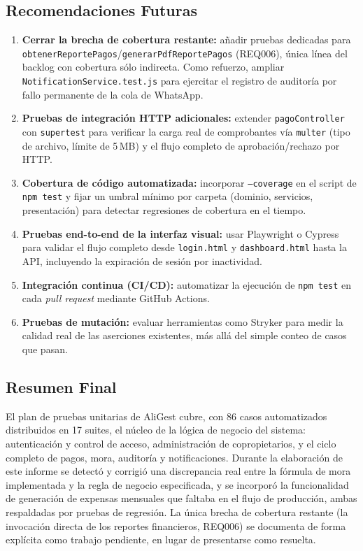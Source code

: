\documentclass[12pt,a4paper]{article}
\begin{document}
\subsection{Recomendaciones Futuras}
\begin{enumerate}[nosep]
    \item \textbf{Cerrar la brecha de cobertura restante:} añadir pruebas dedicadas para
    \texttt{obtenerReportePagos}/\texttt{generarPdfReportePagos} (REQ006), única línea del
    backlog con cobertura sólo indirecta. Como refuerzo, ampliar
    \texttt{NotificationService.test.js} para ejercitar el registro de auditoría por fallo
    permanente de la cola de WhatsApp.
    \item \textbf{Pruebas de integración HTTP adicionales:} extender
    \texttt{pagoController} con \texttt{supertest} para verificar la carga real de
    comprobantes vía \texttt{multer} (tipo de archivo, límite de 5\,MB) y el flujo completo
    de aprobación/rechazo por HTTP.
    \item \textbf{Cobertura de código automatizada:} incorporar \texttt{--coverage} en el
    script de \texttt{npm test} y fijar un umbral mínimo por carpeta (dominio, servicios,
    presentación) para detectar regresiones de cobertura en el tiempo.
    \item \textbf{Pruebas end-to-end de la interfaz visual:} usar Playwright o Cypress
    para validar el flujo completo desde \texttt{login.html} y \texttt{dashboard.html}
    hasta la API, incluyendo la expiración de sesión por inactividad.
    \item \textbf{Integración continua (CI/CD):} automatizar la ejecución de
    \texttt{npm test} en cada \emph{pull request} mediante GitHub Actions.
    \item \textbf{Pruebas de mutación:} evaluar herramientas como Stryker para medir la
    calidad real de las aserciones existentes, más allá del simple conteo de casos que
    pasan.
\end{enumerate}

\subsection{Resumen Final}

El plan de pruebas unitarias de AliGest cubre, con 86 casos automatizados distribuidos en
17 suites, el núcleo de la lógica de negocio del sistema: autenticación y control de
acceso, administración de copropietarios, y el ciclo completo de pagos, mora, auditoría y
notificaciones. Durante la elaboración de este informe se detectó y corrigió una
discrepancia real entre la fórmula de mora implementada y la regla de negocio especificada,
y se incorporó la funcionalidad de generación de expensas mensuales que faltaba en el flujo
de producción, ambas respaldadas por pruebas de regresión. La única brecha de cobertura
restante (la invocación directa de los reportes financieros, REQ006) se documenta de forma
explícita como trabajo pendiente, en lugar de presentarse como resuelta.
\end{document}

